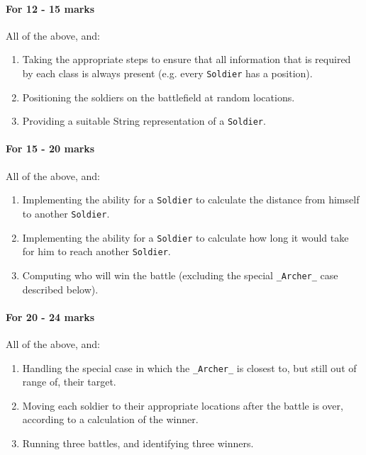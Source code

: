 \documentclass[11pt]{article}
\begin{document}
\paragraph{For 12 - 15 marks}

			All of the above, and:  \begin{enumerate}
								\item Taking the appropriate steps to ensure that all information that is required by each class is always present (e.g. every \texttt{Soldier} has a position).
								\item Positioning the soldiers on the battlefield at random locations.
								\item Providing a suitable String representation of a \texttt{Soldier}.
								\end{enumerate} %

\paragraph{For 15 - 20 marks}

			All of the above, and:  \begin{enumerate}
								\item Implementing the ability for a \texttt{Soldier} to calculate the distance from himself to another \texttt{Soldier}.									\item Implementing the ability for a \texttt{Soldier} to calculate how long it would take for him to reach another \texttt{Soldier}.
								\item Computing who will win the battle (excluding the special \texttt{_Archer_} case described below).
								\end{enumerate} %

\paragraph{For 20 - 24 marks}
			
			All of the above, and:  \begin{enumerate}
								\item Handling the special case in which the \texttt{_Archer_} is closest to, but still out of range of, their target.
								\item Moving each soldier to their appropriate locations after the battle is over, according to a calculation of the winner.
								\item Running three battles, and identifying three winners.
								\end{enumerate} %
\end{document}
